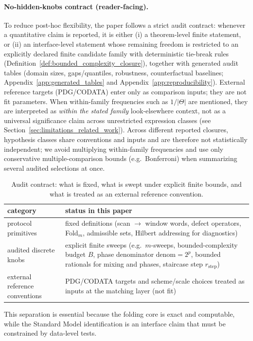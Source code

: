 \paragraph{No-hidden-knobs contract (reader-facing).}
To reduce post-hoc flexibility, the paper follows a strict audit contract: whenever a quantitative claim is reported, it is either (i) a theorem-level finite statement, or (ii) an interface-level statement whose remaining freedom is restricted to an explicitly declared finite candidate family with deterministic tie-break rules (Definition~\ref{def:bounded_complexity_closure}), together with generated audit tables (domain sizes, gaps/quantiles, robustness, counterfactual baselines; Appendix~\ref{app:generated_tables} and Appendix~\ref{app:reproducibility}).
External reference targets (PDG/CODATA) enter only as comparison inputs; they are not fit parameters.
When within-family frequencies such as $1/|\Theta|$ are mentioned, they are interpreted as \emph{within the stated family} look-elsewhere context, not as a universal significance claim across unrestricted expression classes (see Section~\ref{sec:limitations_related_work}).
Across different reported closures, hypothesis classes share conventions and inputs and are therefore not statistically independent; we avoid multiplying within-family frequencies and use only conservative multiple-comparison bounds (e.g.\ Bonferroni) when summarizing several audited selections at once.
\begin{table}[t]
\centering
\scriptsize
\setlength{\tabcolsep}{6pt}
\renewcommand{\arraystretch}{1.15}
\begin{tabular}{p{} p{}}
\toprule
category & status in this paper \\
\midrule
protocol primitives & fixed definitions (scan $\to$ window words, defect operators, Fold$_m$, admissible sets, Hilbert addressing for diagnostics) \\
audited discrete knobs & explicit finite sweeps (e.g.\ $m$-sweeps, bounded-complexity budget $B$, phase denominator $\mathrm{denom}=2^p$, bounded rationals for mixing and phases, staircase step $r_{\mathrm{step}}$) \\
external reference conventions & PDG/CODATA targets and scheme/scale choices treated as inputs at the matching layer (not fit) \\
\bottomrule
\end{tabular}
\caption{Audit contract: what is fixed, what is swept under explicit finite bounds, and what is treated as an external reference convention.}
\label{tab:no_hidden_knobs_contract}
\end{table}
This separation is essential because the folding core is exact and computable, while the Standard Model identification is an interface claim that must be constrained by data-level tests.

